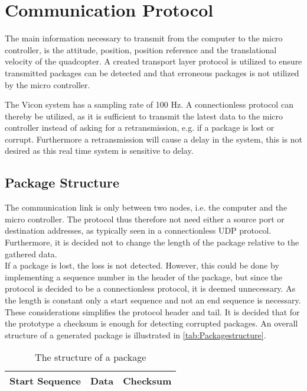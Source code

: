 \section{Communication Protocol}
The main information necessary to transmit from the computer to the micro controller, is the attitude, position, position reference and the translational velocity of the quadcopter. A created transport layer protocol is utilized to ensure transmitted packages can be detected and that erroneous packages is not utilized by the micro controller.

The Vicon system has a sampling rate of 100 Hz. A connectionless protocol can thereby be utilized, as it is sufficient to transmit the latest data to the micro controller instead of asking for a retransmission, e.g. if a package is lost or corrupt. Furthermore a retransmission will cause a delay in the system, this is not desired as this real time system is sensitive to delay.

\subsection{Package Structure}
The communication link is only between two nodes, i.e. the computer and the micro controller. The protocol thus therefore not need either a source port or destination addresses, as typically seen in a connectionless UDP protocol. Furthermore, it is decided not to change the length of the package relative to the gathered data.\\
If a package is lost, the loss is not detected. However, this could be done by implementing a sequence number in the header of the package, but since the protocol is decided to be a connectionless protocol, it is deemed unnecessary. As the length is constant only a start sequence and not an end sequence is necessary. These considerations simplifies the protocol header and tail. It is decided that for the prototype a checksum is enough for detecting corrupted packages. An overall structure of a generated package is illustrated in \autoref{tab:Packagestructure}.

\begin{table}[H]\centering
\begin{tabular}{|>{\centering\arraybackslash}m{3cm}|>{\centering\arraybackslash}m{2cm}|>{\centering\arraybackslash}m{2cm}|}
\hline
Start Sequence & Data & Checksum \\
\hline
\end{tabular}
\caption{The structure of a package}
\label{tab:Packagestructure}
\end{table}

